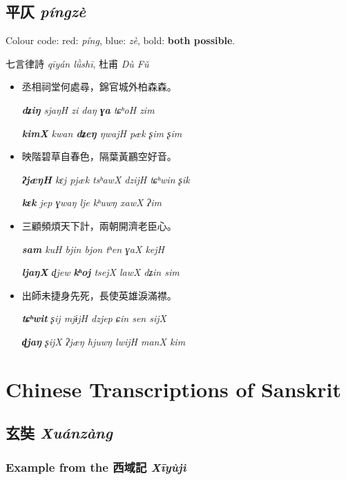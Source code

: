 \documentclass[oneside,a4paper,11pt]{article}
\newcommand{\ipa}[1]{{\phon\textit{#1}}}
\newcommand{\zh}[1]{{\cn #1}}
\newcommand{\zhc}[2]{\zh{#1} \ipa{#2}}
\newcommand{\bleu}[1]{{\color{blue}#1}}
\newcommand{\rouge}[1]{{\color{red}#1}}
\newcommand{\verte}[1]{{\textbf{#1}}}
\begin{document}
 

\subsection{\zhc{平仄}{píngzè}} \label{sec:pingze}

Colour code: red: \zhc{\rouge{平}}{píng}, blue: \zhc{\bleu{仄}}{zè}, bold: \verte{both possible}.

\zhc{七言律詩}{qīyán lǜshī}, \zhc{杜甫}{Dù Fǔ}
\begin{itemize}
\item \zh{丞相祠堂何處尋，錦官城外柏森森。}

\ipa{\verte{dʑiŋ} \bleu{sjaŋH} \rouge{zi} \rouge{daŋ} \verte{ɣa} \bleu{tɕʰoH} \rouge{zim}}

\ipa{\verte{kimX} \rouge{kwan} \verte{dʑeŋ} \bleu{ŋwajH} \bleu{pæk} \rouge{ʂim} \rouge{ʂim}}

\item \zh{映階碧草自春色，隔葉黃鸝空好音。}

\ipa{\verte{ʔjæŋH} \rouge{kɛj} \bleu{pjæk} \bleu{tsʰawX} \bleu{dzijH} \rouge{tɕʰwin} \bleu{ʂik}}

\ipa{\verte{kɛk} \bleu{jep} \rouge{ɣwaŋ} \rouge{lje} \rouge{kʰuwŋ} \bleu{xawX} \rouge{ʔim}}

\item \zh{三顧頻煩天下計，兩朝開濟老臣心。}

\ipa{\verte{sam} \bleu{kuH} \rouge{bjin} \rouge{bjon} \rouge{tʰen} \bleu{ɣaX} \bleu{kejH}}

\ipa{\verte{ljaŋX} \rouge{ɖjew} \verte{kʰoj} \bleu{tsejX} \bleu{lawX} \rouge{dʑin} \rouge{sim}}

\item  \zh{出師未捷身先死，長使英雄淚滿襟。}

\ipa{\verte{tɕʰwit} \rouge{ʂij} \bleu{mjɨjH} \bleu{dzjep} \rouge{ɕin} \rouge{sen} \bleu{sijX}}

\ipa{\verte{ɖjaŋ} \bleu{ʂijX} \rouge{ʔjæŋ} \rouge{hjuwŋ} \bleu{lwijH} \bleu{manX} \rouge{kim}}
\end{itemize}
\section{Chinese Transcriptions of Sanskrit}

\subsection{\zhc{玄奘}{Xuánzàng}}
\subsubsection{Example from the \zhc{西域記}{Xīyùjì}}
\end{document}
